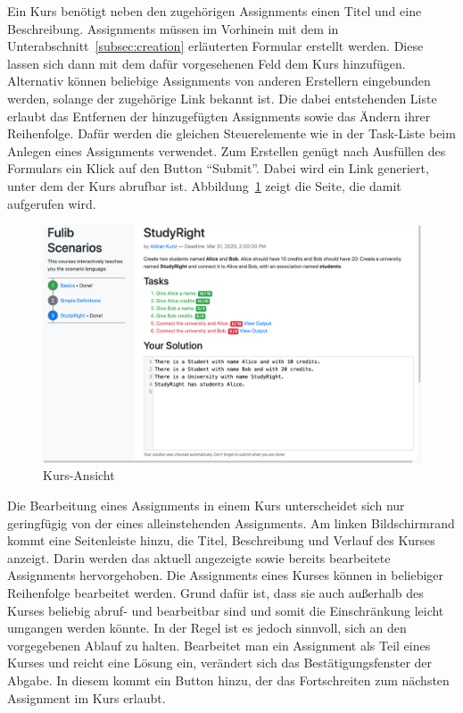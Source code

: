 Ein Kurs benötigt neben den zugehörigen Assignments einen Titel und eine Beschreibung.
Assignments müssen im Vorhinein mit dem in Unterabschnitt~\ref{subsec:creation} erläuterten Formular erstellt werden.
Diese lassen sich dann mit dem dafür vorgesehenen Feld dem Kurs hinzufügen.
Alternativ können beliebige Assignments von anderen Erstellern eingebunden werden, solange der zugehörige Link bekannt ist.
Die dabei entstehenden Liste erlaubt das Entfernen der hinzugefügten Assignments sowie das Ändern ihrer Reihenfolge.
Dafür werden die gleichen Steuerelemente wie in der Task-Liste beim Anlegen eines Assignments verwendet.
Zum Erstellen genügt nach Ausfüllen des Formulars ein Klick auf den Button ``Submit''.
Dabei wird ein Link generiert, unter dem der Kurs abrufbar ist.
Abbildung~\ref{fig:course-view} zeigt die Seite, die damit aufgerufen wird.

\begin{figure}
    \centering
    \includegraphics[width=\textwidth]{chapter/fulib.org/img/course-view.png}
    \caption{Kurs-Ansicht}
    \label{fig:course-view}
\end{figure}

Die Bearbeitung eines Assignments in einem Kurs unterscheidet sich nur geringfügig von der eines alleinstehenden Assignments.
Am linken Bildschirmrand kommt eine Seitenleiste hinzu, die Titel, Beschreibung und Verlauf des Kurses anzeigt.
Darin werden das aktuell angezeigte sowie bereits bearbeitete Assignments hervorgehoben.
Die Assignments eines Kurses können in beliebiger Reihenfolge bearbeitet werden.
Grund dafür ist, dass sie auch außerhalb des Kurses beliebig abruf- und bearbeitbar sind und somit die Einschränkung leicht umgangen werden könnte.
In der Regel ist es jedoch sinnvoll, sich an den vorgegebenen Ablauf zu halten.
Bearbeitet man ein Assignment als Teil eines Kurses und reicht eine Lösung ein, verändert sich das Bestätigungsfenster der Abgabe.
In diesem kommt ein Button hinzu, der das Fortschreiten zum nächsten Assignment im Kurs erlaubt.

